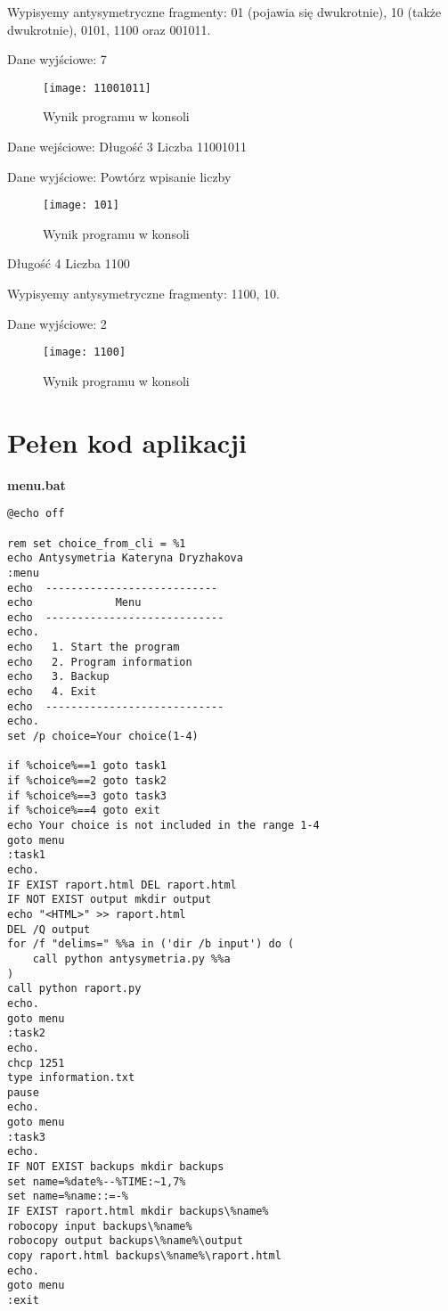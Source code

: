 \documentclass[12pt,a4paper]{article}
\begin{document}
Wypisyemy antysymetryczne fragmenty: 
01 (pojawia się dwukrotnie), 10 (także dwukrotnie), 0101, 1100 oraz 001011.

Dane wyjściowe: 
7

\begin{figure}[htp]
    \centering
    \texttt{[image: 11001011]}
    \caption{Wynik programu w konsoli}
\end{figure}

Dane wejściowe:
Długość 3
Liczba 11001011

Dane wyjściowe: 
Powtórz wpisanie liczby

\begin{figure}[htp]
    \centering
    \texttt{[image: 101]}
    \caption{Wynik programu w konsoli}
\end{figure}

Długość 4
Liczba 1100

Wypisyemy antysymetryczne fragmenty: 
1100, 10.

Dane wyjściowe: 
2

\begin{figure}[htp]
    \centering
    \texttt{[image: 1100]}
    \caption{Wynik programu w konsoli}
\end{figure}


	\newpage
	\section*{Pełen kod aplikacji}
\textbf{menu.bat}
\begin{lstlisting}
@echo off

rem set choice_from_cli = %1
echo Antysymetria Kateryna Dryzhakova
:menu
echo  ---------------------------
echo             Menu             
echo  ----------------------------
echo.                             
echo   1. Start the program       
echo   2. Program information     
echo   3. Backup                  
echo   4. Exit                    
echo  ----------------------------
echo.
set /p choice=Your choice(1-4) 

if %choice%==1 goto task1
if %choice%==2 goto task2
if %choice%==3 goto task3
if %choice%==4 goto exit
echo Your choice is not included in the range 1-4
goto menu
:task1
echo.
IF EXIST raport.html DEL raport.html
IF NOT EXIST output mkdir output
echo "<HTML>" >> raport.html
DEL /Q output
for /f "delims=" %%a in ('dir /b input') do (
    call python antysymetria.py %%a
)
call python raport.py
echo.
goto menu
:task2
echo.
chcp 1251
type information.txt
pause
echo.
goto menu
:task3
echo.
IF NOT EXIST backups mkdir backups
set name=%date%--%TIME:~1,7%
set name=%name::=-%
IF EXIST raport.html mkdir backups\%name%
robocopy input backups\%name%
robocopy output backups\%name%\output
copy raport.html backups\%name%\raport.html
echo.
goto menu
:exit
\end{lstlisting}
\end{document}
